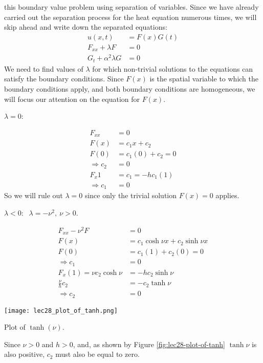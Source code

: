 \vspace{4.0cm}

 this boundary value problem using separation of variables.  Since we have already carried out the separation process for the heat equation numerous times, we will skip ahead and write down the separated equations:
\begin{align*}
u(x,t) &= F(x)G(t) \\
F_{xx} + \lambda F &= 0 \\
G_{t} + \alpha^2 \lambda G &= 0 
\end{align*}
We need to find values of $\lambda$ for which non-trivial solutions to the equations can satisfy the boundary conditions.  Since $F(x)$ is the spatial variable to which the boundary conditions apply, and both boundary conditions are homogeneous, we will focus our attention on the equation for $F(x)$.

\vspace{0.25cm}

\noindent \underline{$\lambda = 0$}:

\begin{align*}
F_{xx} &= 0 \\
F(x) &= c_1x + c_2 \\
F(0) &= c_1(0) + c_2 = 0 \\
\Rightarrow c_2 &= 0 \\
F_x{1} &= c_1 = -hc_1(1) \\
\Rightarrow c_1&= 0
\end{align*} So we will rule out $\lambda=0$ since only the trivial solution $F(x)=0$ applies.

\vspace{0.25cm}

\noindent \underline{$\lambda < 0$}:  $\ \ \lambda = -\nu^2, \ \nu>0$.

\begin{align*}
F_{xx} - \nu^2F &= 0 \\
F(x) &= c_1 \cosh{\nu x} + c_2 \sinh{\nu x} \\
F(0) &= c_1(1) + c_2(0) = 0 \\
\Rightarrow c_1 &= 0 \\
F_{x}(1) = \nu c_2 \cosh{\nu} &= -h c_2 \sinh{\nu} \\
\frac{\nu}{h}c_2 &= -c_2\tanh{\nu} \\
\Rightarrow c_2 &= 0
\end{align*}
\begin{marginfigure}
\texttt{[image: lec28\_plot\_of\_tanh.png]}
\caption{Plot of $\tanh{(\nu)}$.}
\label{fig:lec28-plot-of-tanh}
\end{marginfigure}
Since $\nu>0$ and $h>0$, and, as shown by Figure \ref{fig:lec28-plot-of-tanh} $\tanh{\nu}$ is also positive, $c_2$ must also be equal to zero.

